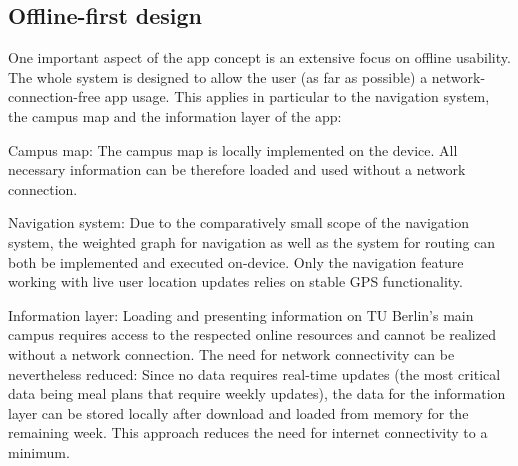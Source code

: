 
\subsection{Offline-first design}
One important aspect of the app concept is an extensive focus on offline usability. The whole system is designed to allow the user (as far as possible) a network-connection-free app usage. This applies in particular to the navigation system, the campus map and the information layer of the app:

Campus map: The campus map is locally implemented on the device. All necessary information can be therefore loaded and used without a network connection.

Navigation system: Due to the comparatively small scope of the navigation system, the weighted graph for navigation as well as the system for routing can both be implemented and executed on-device. Only the navigation feature working with live user location updates relies on stable GPS functionality.

Information layer: Loading and presenting information on TU Berlin's main campus requires access to the respected online resources and cannot be realized without a network connection. The need for network connectivity can be nevertheless reduced: Since no data requires real-time updates (the most critical data being meal plans that require weekly updates), the data for the information layer can be stored locally after download and loaded from memory for the remaining week. This approach reduces the need for internet connectivity to a minimum.


